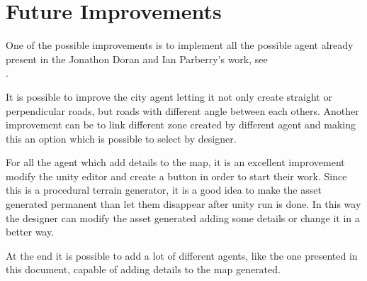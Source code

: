 \documentclass[12pt]{article}
\begin{document}
    \newpage

    \section{Future Improvements}
    One of the possible improvements is to implement all the possible agent already present in the Jonathon Doran and Ian Parberry's work,
    see \\ \cite{article}.
    
    It is possible to improve the city agent letting it not only create straight or perpendicular roads, but roads with different angle between each
    others. Another improvement can be to link different zone created by different agent and making this an option which is possible to select by designer.

    For all the agent which add details to the map, it is an excellent improvement modify the unity editor and create a button in order to start their work. 
    Since this is a procedural terrain generator, it is a good idea to make the asset generated permanent than let them disappear after unity run is done.
    In this way the designer can modify the asset generated adding some details or change it in a better way.

    At the end it is possible to add a lot of different agents, like the one presented in this document, capable of adding details to the map generated. 

    \newpage
    
    
\end{document}
